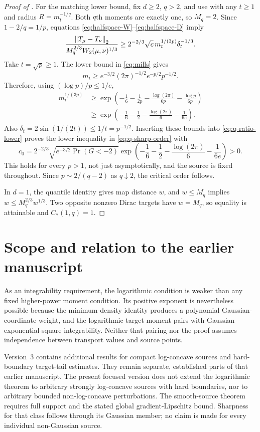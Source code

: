 \documentclass[11pt]{article}
\numberwithin{equation}{section}
\theoremstyle{remark}\newtheorem{remark}[theorem]{Remark}
\begin{document}
\begin{proof}[Proof of ]
For the matching lower bound, fix $d\ge2$, $q>2$, and use  with any $t\ge1$ and radius $R=m_t^{-1/q}$. Both $q$th moments are exactly one, so $M_q=2$. Since $1-2/q=1/p$, equations \eqref{eq:halfspace-W}--\eqref{eq:halfspace-D} imply
\begin{equation}\label{eq:q-ratio-lower}
 \frac{\left\lVert T_\mu-T_\nu\right\rVert_2}{M_q^{2/3}W_2(\mu,\nu)^{1/3}}
 \ge2^{-2/3}\sqrt c\,m_t^{1/(3p)}\delta_t^{-1/3}.
\end{equation}
Take $t=\sqrt p\ge1$. The lower bound in \eqref{eq:mills} gives
\[
 m_t\ge e^{-3/2}(2\pi)^{-1/2}e^{-p/2}p^{-1/2}.
\]
Therefore, using $(\log p)/p\le1/e$,
\begin{align*}
 m_t^{1/(3p)}
 &\ge\exp\left(-\frac16-\frac1{2p}
                   -\frac{\log(2\pi)}{6p}-\frac{\log p}{6p}\right)\\
 &\ge\exp\left(-\frac16-\frac12-\frac{\log(2\pi)}6-\frac1{6e}\right).
\end{align*}
Also $\delta_t=2\sin(1/(2t))\le1/t=p^{-1/2}$. Inserting these bounds into \eqref{eq:q-ratio-lower} proves the lower inequality in \eqref{eq:q-sharp-order} with
\begin{equation}\label{eq:q-c0}
 c_0=2^{-2/3}\sqrt{e^{-3/2}\Pr(G<-2)}
 \exp\left(-\frac16-\frac12-\frac{\log(2\pi)}6-\frac1{6e}\right)>0.
\end{equation}
This holds for every $p>1$, not just asymptotically, and the source is fixed throughout. Since $p\sim2/(q-2)$ as $q\downarrow2$, the critical order follows.

In $d=1$, the quantile identity gives map distance $w$, and $w\le M_q$ implies $w\le M_q^{2/3}w^{1/3}$. Two opposite nonzero Dirac targets have $w=M_q$, so equality is attainable and $C_*(1,q)=1$.
\end{proof}

\section{Scope and relation to the earlier manuscript}
As an integrability requirement, the logarithmic condition is weaker than any fixed higher-power moment condition. Its positive exponent is nevertheless possible because the minimum-density identity produces a polynomial Gaussian-coordinate weight, and the logarithmic target moment pairs with Gaussian exponential-square integrability. Neither that pairing nor the proof assumes independence between transport values and source points.

Version~3 \cite{ManuscriptV3} contains additional results for compact log-concave sources and hard-boundary target-tail estimates. They remain separate, established parts of that earlier manuscript. The present focused version does not extend the logarithmic theorem to arbitrary strongly log-concave sources with hard boundaries, nor to arbitrary bounded non-log-concave perturbations. The smooth-source theorem requires full support and the stated global gradient-Lipschitz bound. Sharpness for that class follows through its Gaussian member; no claim is made for every individual non-Gaussian source.
\end{document}
